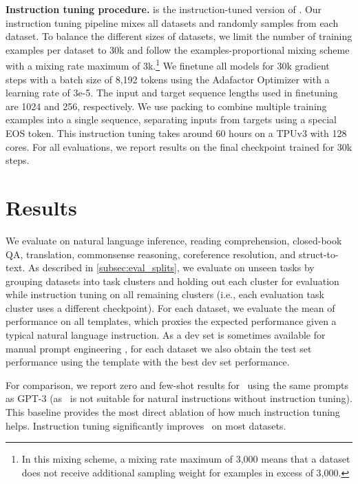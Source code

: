 \textbf{Instruction tuning procedure.}
\flan{} is the instruction-tuned version of \baselm. 
Our instruction tuning pipeline mixes all datasets and randomly samples from each dataset.
To balance the different sizes of datasets, we limit the number of training examples per dataset to 30k and follow the examples-proportional mixing scheme \citep{raffel2019exploring} with a mixing rate maximum of 3k.\footnote{In this mixing scheme, a mixing rate maximum of 3,000 means that a dataset does not receive additional sampling weight for examples in excess of 3,000.}
We finetune all models for 30k gradient steps with a batch size of 8,192 tokens using the Adafactor Optimizer \citep{shazeer2018adafactor} with a learning rate of 3e-5. 
The input and target sequence lengths used in finetuning are 1024 and 256, respectively. 
We use packing \citep{raffel2019exploring} to combine multiple training examples into a single sequence, separating inputs from targets using a special EOS token.
This instruction tuning takes around 60 hours on a TPUv3 with 128 cores.
For all evaluations, we report results on the final checkpoint trained for 30k steps.

\vspace{-1mm}
\section{Results}\label{sec:results}
\vspace{-2mm}
We evaluate \flan{} on natural language inference, reading comprehension, closed-book QA, translation, commonsense reasoning, coreference resolution, and struct-to-text. 
As described in \cref{subsec:eval_splits}, we evaluate on unseen tasks by grouping datasets into task clusters and holding out each cluster for evaluation while instruction tuning on all remaining clusters (i.e., each evaluation task cluster uses a different checkpoint).
For each dataset, we evaluate the mean of performance on all templates, which proxies the expected performance given a typical natural language instruction.
As a dev set is sometimes available for manual prompt engineering \citep{brown2020language}, for each dataset we also obtain the test set performance using the template with the best dev set performance.

For comparison, we report zero and few-shot results for \baselm\ using the same prompts as GPT-3 (as \baselm\ is not suitable for natural instructions without instruction tuning).
This baseline provides the most direct ablation of how much instruction tuning helps.
Instruction tuning significantly improves \baselm\ on most datasets.

